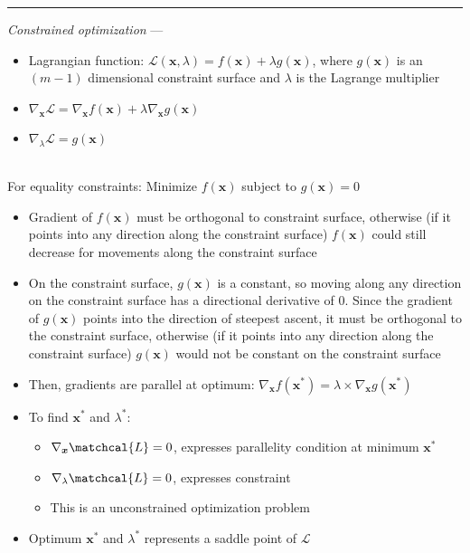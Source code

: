 {\color{lightgray}\hrule height 0.001mm}

\emph{Constrained optimization} --- 
\begin{itemize}
    \item Lagrangian function: $\mathcal{L}(\boldsymbol{x},\lambda) = f(\boldsymbol{x}) + \lambda g(\boldsymbol{x})$, where $g(\boldsymbol{x})$ is an $(m-1)$ dimensional constraint surface and $\lambda$ is the Lagrange multiplier
    \item$\nabla_{\boldsymbol{x}} \mathcal{L} = \nabla_{\boldsymbol{x}} f(\boldsymbol{x}) + \lambda \nabla_{\boldsymbol{x}} g(\boldsymbol{x})$
    \item$\nabla_{\lambda} \mathcal{L} = g(\boldsymbol{x})$
\end{itemize}\\
For equality constraints: Minimize $f(\boldsymbol{x})$ subject to $g(\boldsymbol{x}) = 0$
\begin{itemize}
    \item Gradient of $f(\boldsymbol{x})$ must be orthogonal to constraint surface, otherwise (if it points into any direction along the constraint surface) $f(\boldsymbol{x})$ could still decrease for movements along the constraint surface
    \item On the constraint surface, $g(\boldsymbol{x})$ is a constant, so moving along any direction on the constraint surface has a directional derivative of 0. Since the gradient of $g(\boldsymbol{x})$ points into the direction of steepest ascent, it must be orthogonal to the constraint surface, otherwise (if it points into any direction along the constraint surface) $g(\boldsymbol{x})$ would not be constant on the constraint surface
    \item Then, gradients are parallel at optimum: $\nabla_{\boldsymbol{x}} f(\boldsymbol{x^*}) = \lambda \times \nabla_{\boldsymbol{x}} g(\boldsymbol{x^*})$
    \item To find $\boldsymbol{x^*}$ and $\lambda^*$: 
    \begin{itemize}
        \item $\nabla_{\boldsymbol{x}} \matchcal{L} = 0$, expresses parallelity condition at minimum $\boldsymbol{x^*}$
        \item $\nabla_{\lambda} \matchcal{L} = 0$, expresses constraint
        \item This is an unconstrained optimization problem
    \end{itemize}
    \item Optimum $\boldsymbol{x^*}$ and $\lambda^*$ represents a saddle point of $\mathcal{L}$
\end{itemize}\\
